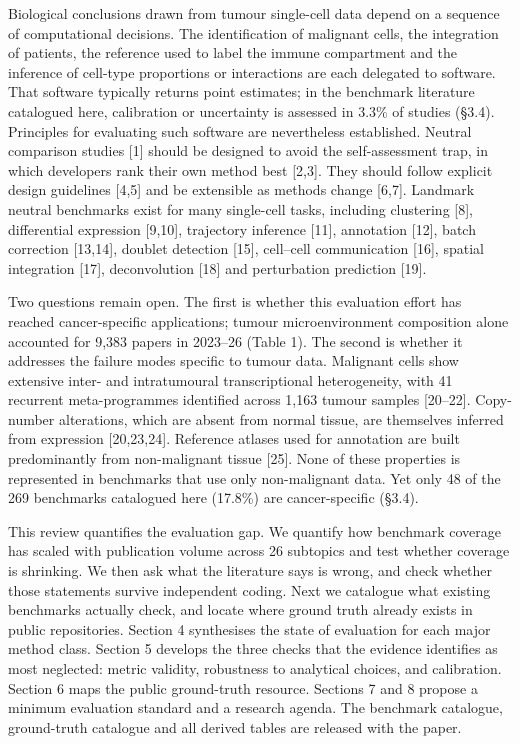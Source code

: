 \documentclass[11pt]{article}
\begin{document}
Biological conclusions drawn from tumour single-cell data depend on a
sequence of computational decisions. The identification of malignant
cells, the integration of patients, the reference used to label the
immune compartment and the inference of cell-type proportions or
interactions are each delegated to software. That software typically
returns point estimates; in the benchmark literature catalogued here,
calibration or uncertainty is assessed in 3.3\% of studies (§3.4).
Principles for evaluating such software are nevertheless established.
Neutral comparison studies {[}1{]} should be designed to avoid the
self-assessment trap, in which developers rank their own method best
{[}2,3{]}. They should follow explicit design guidelines {[}4,5{]} and
be extensible as methods change {[}6,7{]}. Landmark neutral benchmarks
exist for many single-cell tasks, including clustering {[}8{]},
differential expression {[}9,10{]}, trajectory inference {[}11{]},
annotation {[}12{]}, batch correction {[}13,14{]}, doublet detection
{[}15{]}, cell--cell communication {[}16{]}, spatial integration
{[}17{]}, deconvolution {[}18{]} and perturbation prediction {[}19{]}.

Two questions remain open. The first is whether this evaluation effort
has reached cancer-specific applications; tumour microenvironment
composition alone accounted for 9,383 papers in 2023--26 (Table 1). The
second is whether it addresses the failure modes specific to tumour
data. Malignant cells show extensive inter- and intratumoural
transcriptional heterogeneity, with 41 recurrent meta-programmes
identified across 1,163 tumour samples {[}20--22{]}. Copy-number
alterations, which are absent from normal tissue, are themselves
inferred from expression {[}20,23,24{]}. Reference atlases used for
annotation are built predominantly from non-malignant tissue {[}25{]}.
None of these properties is represented in benchmarks that use only
non-malignant data. Yet only 48 of the 269 benchmarks catalogued here
(17.8\%) are cancer-specific (§3.4).

This review quantifies the evaluation gap. We quantify how benchmark
coverage has scaled with publication volume across 26 subtopics and test
whether coverage is shrinking. We then ask what the literature says is
wrong, and check whether those statements survive independent coding.
Next we catalogue what existing benchmarks actually check, and locate
where ground truth already exists in public repositories. Section 4
synthesises the state of evaluation for each major method class. Section
5 develops the three checks that the evidence identifies as most
neglected: metric validity, robustness to analytical choices, and
calibration. Section 6 maps the public ground-truth resource. Sections 7
and 8 propose a minimum evaluation standard and a research agenda. The
benchmark catalogue, ground-truth catalogue and all derived tables are
released with the paper.
\end{document}
